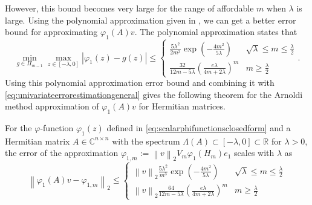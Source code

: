 However, this bound becomes very large for the range of affordable $m$ when $\lambda$
is large.
Using the polynomial approximation given in \cite[Lemma A.1]{kressner2019krylov},
we can get a better error bound for approximating $\varphi_1(A)v$.
The polynomial approximation states that
\begin{equation}
    \min_{g \in \Pi_{m-1}} \max_{z \in [-\lambda, 0]} \left|\varphi_1(z) - g(z) \right| \le
    \begin{cases}
        \frac{5\lambda^2}{2m^3} \exp \left( -\frac{4m^2}{5\lambda} \right) & \sqrt{\lambda} \le m \le \frac{\lambda}{2}
        \\
        \frac{32}{12m-5\lambda} \left( \frac{e \lambda}{4m+2\lambda} \right)^m & m \ge \frac{\lambda}{2}
    \end{cases}.
\end{equation}
Using this polynomial approximation error bound and combining it with
\eqref{eq:univariateerrorestimationgeneral} gives the following theorem for the
Arnoldi method approximation of $\varphi_1(A)v$ for Hermitian matrices.
\begin{theorem}
    \label{the:univariateerrorestimationchebyshev}
    For the $\varphi$-function $\varphi_1(z)$ defined in \eqref{eq:scalarphifunctionsclosedform}
    and a Hermitian matrix $A \in \mathbb{C}^{n \times n}$ with the spectrum
    $\Lambda(A) \subset [-\lambda, 0] \subset \mathbb{R}$ for $\lambda > 0$,
    the error of the approximation $\varphi_{1, m} := \left\| v \right\|_{2} V_m \varphi_1(H_m) e_1$
    scales with $\lambda$ as
    \begin{equation}
        \label{eq:univariateerrorestimationphi1}
        \left\| \varphi_1(A)v - \varphi_{1, m} \right\|_2 \le
        \begin{cases}
            \left\| v \right\|_2 \frac{5\lambda^2}{m^3} \exp \left( -\frac{4m^2}{5\lambda} \right)
            & \sqrt{\lambda} \le m \le \frac{\lambda}{2}
            \\
            \left\| v \right\|_2 \frac{64}{12m-5\lambda} \left( \frac{e \lambda}{4m+2\lambda} \right)^m
            & m \ge \frac{\lambda}{2}
        \end{cases}
    \end{equation}
\end{theorem}

